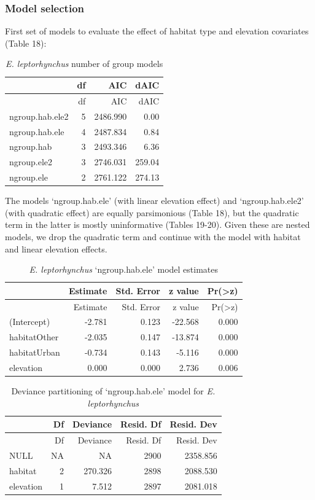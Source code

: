 \documentclass[]{article}
\begin{document}
\subsubsection{Model selection}\label{model-selection-1}

First set of models to evaluate the effect of habitat type and elevation
covariates (Table 18):

\begin{longtable}[]{@{}lrrr@{}}
\caption{\textit{E. leptorhynchus} number of group
models}\tabularnewline
\toprule
& df & AIC & dAIC\tabularnewline
\midrule
\endfirsthead
\toprule
& df & AIC & dAIC\tabularnewline
\midrule
\endhead
ngroup.hab.ele2 & 5 & 2486.990 & 0.00\tabularnewline
ngroup.hab.ele & 4 & 2487.834 & 0.84\tabularnewline
ngroup.hab & 3 & 2493.346 & 6.36\tabularnewline
ngroup.ele2 & 3 & 2746.031 & 259.04\tabularnewline
ngroup.ele & 2 & 2761.122 & 274.13\tabularnewline
\bottomrule
\end{longtable}

The models `ngroup.hab.ele' (with linear elevation effect) and
`ngroup.hab.ele2' (with quadratic effect) are equally parsimonious
(Table 18), but the quadratic term in the latter is mostly uninformative
(Tables 19-20). Given these are nested models, we drop the quadratic
term and continue with the model with habitat and linear elevation
effects.

\begin{longtable}[]{@{}lrrrr@{}}
\caption{\textit{E. leptorhynchus} `ngroup.hab.ele' model
estimates}\tabularnewline
\toprule
& Estimate & Std. Error & z value &
Pr(\textgreater{}\textbar{}z\textbar{})\tabularnewline
\midrule
\endfirsthead
\toprule
& Estimate & Std. Error & z value &
Pr(\textgreater{}\textbar{}z\textbar{})\tabularnewline
\midrule
\endhead
(Intercept) & -2.781 & 0.123 & -22.568 & 0.000\tabularnewline
habitatOther & -2.035 & 0.147 & -13.874 & 0.000\tabularnewline
habitatUrban & -0.734 & 0.143 & -5.116 & 0.000\tabularnewline
elevation & 0.000 & 0.000 & 2.736 & 0.006\tabularnewline
\bottomrule
\end{longtable}

\begin{longtable}[]{@{}lrrrr@{}}
\caption{Deviance partitioning of `ngroup.hab.ele' model for
\textit{E. leptorhynchus}}\tabularnewline
\toprule
& Df & Deviance & Resid. Df & Resid. Dev\tabularnewline
\midrule
\endfirsthead
\toprule
& Df & Deviance & Resid. Df & Resid. Dev\tabularnewline
\midrule
\endhead
NULL & NA & NA & 2900 & 2358.856\tabularnewline
habitat & 2 & 270.326 & 2898 & 2088.530\tabularnewline
elevation & 1 & 7.512 & 2897 & 2081.018\tabularnewline
\bottomrule
\end{longtable}
\end{document}
